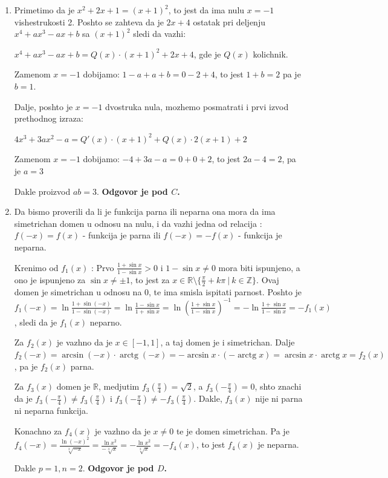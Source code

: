 \documentclass[a4paper,12pt]{article}
\renewcommand{\arctg}{\operatorname{arctg}}
\begin{document}
\begin{enumerate}[1.]
\item Primetimo da je $x^2 +2x+1 = (x+1)^2$, to jest da ima nulu $x =-1$ vishestrukosti 2. Poshto se zahteva da je $2x+4$ ostatak pri deljenju $x^4 + ax^3 -ax +b $ sa $(x+1)^2$ sledi da vazhi:
\par  $x^4 + ax^3 -ax +b  = Q(x) \cdot (x+1)^2 + 2x+4$, gde je $Q(x)$ kolichnik.
\par Zamenom $x=-1$ dobijamo: $1-a+a+b = 0 -2 +4 $, to jest $ 1+b = 2$ pa je $b = 1$.
\par Dalje, poshto je $x=-1$ dvostruka nula, mozhemo posmatrati i prvi izvod prethodnog izraza:
\par $4x^3 + 3ax^2 -a = Q'(x) \cdot (x+1)^2 + Q(x) \cdot 2(x+1) + 2$
\par Zamenom $x=-1$ dobijamo: $-4 + 3a -a = 0+0+2$, to jest $2a-4 = 2$, pa je $a = 3$
\par Dakle proizvod $ab =3 $. \textbf{Odgovor je pod $C$.}

\item Da bismo proverili da li je funkcija parna ili neparna ona mora da ima simetrichan domen u odnosu na nulu, i da vazhi jedna od relacija : $f(-x) = f(x) $ - funkcija je parna ili $f(-x) = -f(x) $ - funkcija je neparna.
\par Krenimo od $f_1(x)$ : Prvo $\frac{1 + \sin{x}}{1 - \sin{x}} > 0$ i $1 - \sin{x} \neq 0$ mora biti ispunjeno, a ono je ispunjeno za $\sin{x} \neq \pm 1$, to jest za $x \in \mathbb{R}\setminus\{\frac{\pi}{2}+k\pi\ |\ k\in\mathbb{Z}\}$. Ovaj domen je simetrichan u odnosu na 0, te ima smisla ispitati parnost. Poshto je $f_1(-x) = \ln \frac{1 + \sin(-x)}{1 - \sin(-x)} =\ln \frac{1 - \sin{x}}{1 + \sin{x}} =   \ln \left(\frac{1 + \sin{x}}{1 - \sin{x}}\right)^{-1} =-\ln\frac{1 + \sin{x}}{1 - \sin{x}}=-f_1(x) $, sledi da je $f_1(x)$ neparno.
\par Za $f_2(x)$ je vazhno da je $x \in [-1,1]$, a taj domen je i simetrichan. Dalje $ f_2(-x) = \arcsin(-x) \cdot \arctg(-x) = -  \arcsin{x} \cdot ( - \arctg{x} ) =  \arcsin{x} \cdot \arctg{x}  = f_2(x)$, pa je $f_2(x)$ parna.
\par Za $f_3(x) $ domen je $\mathbb{R}$, medjutim $f_3 \left(\frac{\pi}{4}\right) = \sqrt{2}$, a $f_3 \left(- \frac{\pi}{4}\right) = 0$, shto znachi da je $f_3 \left(-\frac{\pi}{4}\right) \neq f_3 \left(\frac{\pi}{4}\right)$ i $f_3 \left(-\frac{\pi}{4}\right)\neq-f_3 \left(\frac{\pi}{4}\right)$. Dakle, $f_3(x)$ nije ni parna ni neparna funkcija.
\par Konachno za $f_4(x)$ je vazhno da je $x\neq 0$ te je domen simetrichan. Pa je $f_4(-x) = \frac{\ln{(-x)^2}}{\sqrt[3]{-x}} = \frac{\ln{x^2}}{-\sqrt[3]{x}} = - \frac{\ln{x^2}}{\sqrt[3]{x}} = - f_4(x)$, to jest $f_4(x)$ je neparna. 
\par Dakle $p = 1,n=2$.  \textbf{Odgovor je pod $D$.}


\end{enumerate}
\end{document}
